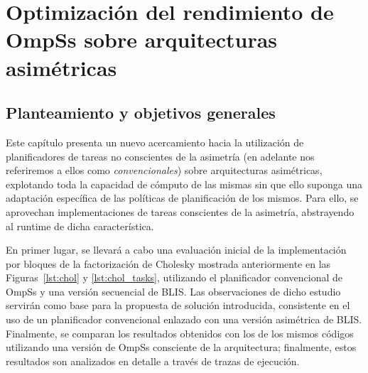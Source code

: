 \cleardoublepage

\chapter{Optimización del rendimiento de OmpSs sobre arquitecturas asimétricas}
\label{ch:chapter4}

%
%
%
%
\section{Planteamiento y objetivos generales}

Este capítulo presenta un nuevo acercamiento hacia la utilización de planificadores de tareas
no conscientes de la asimetría (en adelante nos referiremos a ellos como {\em convencionales})
sobre arquitecturas asimétricas, explotando toda la capacidad de cómputo de las mismas sin que
ello suponga una adaptación específica de las políticas de planificación de los mismos. Para ello,
se aprovechan implementaciones de tareas conscientes de la asimetría, abstrayendo al runtime de
dicha característica. 

En primer lugar, se llevará a cabo una evaluación inicial de la implementación por bloques de 
la factorización de Cholesky mostrada anteriormente en las Figuras~\ref{lst:chol} y \ref{lst:chol_tasks},
utilizando el planificador convencional de OmpSs y una versión secuencial de BLIS. Las observaciones de
dicho estudio servirán como base para la propuesta de solución introducida, consistente en el uso de
un planificador convencional enlazado con una versión asimétrica de BLIS. Finalmente, se comparan los
resultados obtenidos con los de los mismos códigos utilizando una versión de OmpSs consciente de la
arquitectura; finalmente, estos resultados son analizados en detalle a través de trazas de ejecución.

